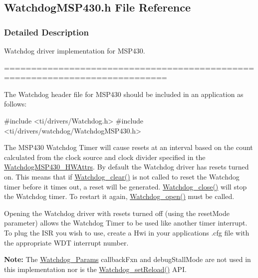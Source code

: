 \subsection{Watchdog\+M\+S\+P430.\+h File Reference}
\label{_watchdog_m_s_p430_8h}


\subsubsection{Detailed Description}
Watchdog driver implementation for M\+S\+P430. 

============================================================================

The Watchdog header file for M\+S\+P430 should be included in an application as follows\+: 
\begin{DoxyCode}
\textcolor{preprocessor}{#include <ti/drivers/Watchdog.h>}
\textcolor{preprocessor}{#include <ti/drivers/watchdog/WatchdogMSP430.h>}
\end{DoxyCode}


The M\+S\+P430 Watchdog Timer will cause resets at an interval based on the count calculated from the clock source and clock divider specified in the \hyperlink{struct_watchdog_m_s_p430___h_w_attrs}{Watchdog\+M\+S\+P430\+\_\+\+H\+W\+Attrs}. By default the Watchdog driver has resets turned on. This means that if \hyperlink{_watchdog_8h_a396decd6b1807db10c636f9987c3be4c}{Watchdog\+\_\+clear()} is not called to reset the Watchdog timer before it times out, a reset will be generated. \hyperlink{_watchdog_8h_a1c0dfea7011b06f303d01afb631ffbdd}{Watchdog\+\_\+close()} will stop the Watchdog timer. To restart it again, \hyperlink{_watchdog_8h_aa5ce656aa6d5199e1efdb4ca2cd9fb7c}{Watchdog\+\_\+open()} must be called.

Opening the Watchdog driver with resets turned off (using the reset\+Mode parameter) allows the Watchdog Timer to be used like another timer interrupt. To plug the I\+S\+R you wish to use, create a Hwi in your application\textquotesingle{}s .cfg file with the appropriate W\+D\+T interrupt number.

{\bfseries Note\+:} The \hyperlink{struct_watchdog___params}{Watchdog\+\_\+\+Params} callback\+Fxn and debug\+Stall\+Mode are not used in this implementation nor is the \hyperlink{_watchdog_8h_a77ec81e1304fe05b77a9976e10e2d9a3}{Watchdog\+\_\+set\+Reload()} A\+P\+I. 

